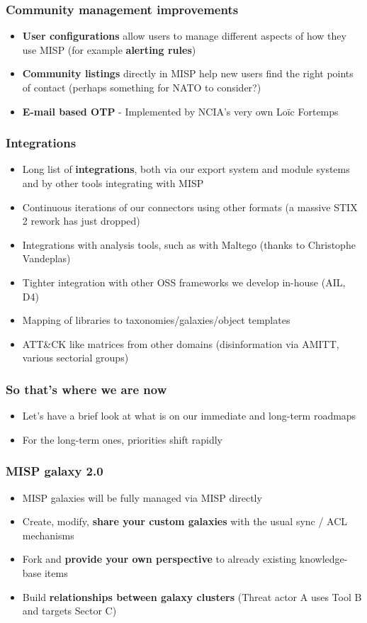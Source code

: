 \begin{frame}
\frametitle{Community management improvements}
\begin{itemize}
	\item {\bf User configurations} allow users to manage different aspects of how they use MISP (for example {\bf alerting rules})
        \item {\bf Community listings} directly in MISP help new users find the right points of contact (perhaps something for NATO to consider?)
        \item {\bf E-mail based OTP} - Implemented by NCIA's very own Loïc Fortemps
\end{itemize}
\end{frame}

\begin{frame}
\frametitle{Integrations}
\begin{itemize}
	\item Long list of {\bf integrations}, both via our export system and module systems and by other tools integrating with MISP
        \item Continuous iterations of our connectors using other formats (a massive STIX 2 rework has just dropped)
        \item Integrations with analysis tools, such as with Maltego (thanks to Christophe Vandeplas)
        \item Tighter integration with other OSS frameworks we develop in-house (AIL, D4)
        \item Mapping of libraries to taxonomies/galaxies/object templates
        \item ATT\&CK like matrices from other domains (disinformation via AMITT, various sectorial groups)
\end{itemize}
\end{frame}

\begin{frame}
\frametitle{So that's where we are now}
\begin{itemize}
	\item Let's have a brief look at what is on our immediate and long-term roadmaps
        \item For the long-term ones, priorities shift rapidly
\end{itemize}
\end{frame}


\begin{frame}
\frametitle{MISP galaxy 2.0}
\begin{itemize}
	\item MISP galaxies will be fully managed via MISP directly
        \item Create, modify, {\bf share your custom galaxies} with the usual sync / ACL mechanisms
        \item Fork and {\bf provide your own perspective} to already existing knowledge-base items
        \item Build {\bf relationships between galaxy clusters} (Threat actor A uses Tool B and targets Sector C)
\end{itemize}
\end{frame}

